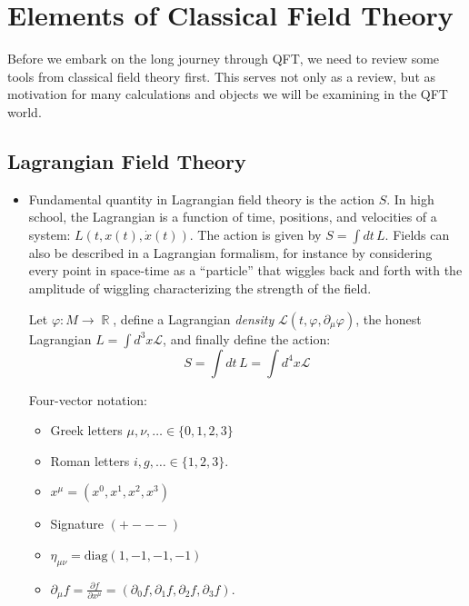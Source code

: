 \documentclass{report}
\theoremstyle{plain}
\theoremstyle{definition}
\theoremstyle{remark}
\newcommand{\FR}[2]{\frac{#1}{#2}}
\newcommand{\mc}{\mathcal}
\newcommand{\vphi}{\varphi}
\newcommand{\di}{\partial}
\DeclareMathOperator{\bR}{\mathbb{R}}
\begin{document}
\section{Elements of Classical Field Theory}

Before we embark on the long journey through QFT, we need to review
some tools from classical field theory first. This serves not only as
a review, but as motivation for many calculations and objects we will
be examining in the QFT world.

\subsection{Lagrangian Field Theory}

\begin{itemize}
\item Fundamental quantity in Lagrangian field theory is the action $S$.
In high school, the Lagrangian is a function of time,
positions, and velocities of a system: $L(t,x(t),\dot x(t))$. The action
is given by $S = \int dt\, L$.
Fields can also be described in a Lagrangian formalism, for instance by
considering every point in space-time as a ``particle'' that wiggles back
and forth with the amplitude of wiggling characterizing the strength of the
field.

Let $\vphi : M \to \bR$, define a Lagrangian \emph{density} $\mc
L(t,\vphi,\di_\mu \vphi)$, the honest Lagrangian $L = \int d^3x \mc L$, and
finally define the action: \[ S = \int dt\, L = \int d^4x \mc L \]

\begin{mdframed}
    Four-vector notation:
    \begin{itemize}
        \item Greek letters $\mu,\nu,\ldots \in \{0,1,2,3\}$
        \item Roman letters $i,g,\ldots \in \{1,2,3\}$.
        \item $x^\mu = (x^0,x^1,x^2,x^3)$
        \item Signature $(+---)$
        \item $\eta_{\mu\nu} = \mathrm{diag}(1,-1,-1,-1)$
        \item $\di_\mu f = \FR{\di f}{\di x^\mu} = (\di_0 f,\di_1 f,\di_2
            f,\di_3 f)$.
    \end{itemize}
\end{mdframed}


\end{itemize}
\end{document}
